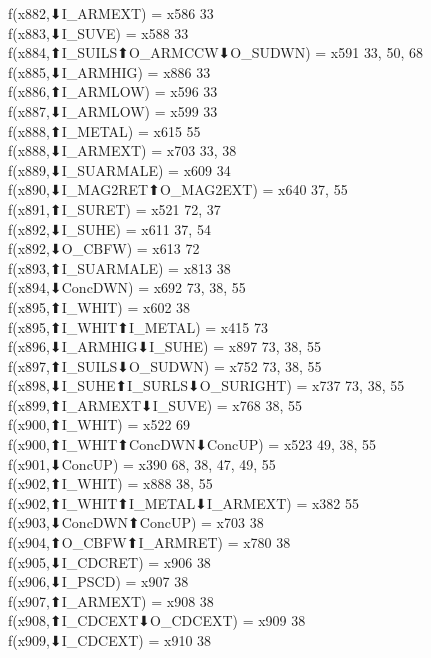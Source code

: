 f(x882,⬇I_ARMEXT) = x586 {33} \\
f(x883,⬇I_SUVE) = x588 {33} \\
f(x884,⬆I_SUILS⬆O_ARMCCW⬇O_SUDWN) = x591 {33, 50, 68} \\
f(x885,⬇I_ARMHIG) = x886 {33} \\
f(x886,⬆I_ARMLOW) = x596 {33} \\
f(x887,⬇I_ARMLOW) = x599 {33} \\
f(x888,⬆I_METAL) = x615 {55} \\
f(x888,⬇I_ARMEXT) = x703 {33, 38} \\
f(x889,⬇I_SUARMALE) = x609 {34} \\
f(x890,⬇I_MAG2RET⬆O_MAG2EXT) = x640 {37, 55} \\
f(x891,⬆I_SURET) = x521 {72, 37} \\
f(x892,⬇I_SUHE) = x611 {37, 54} \\
f(x892,⬇O_CBFW) = x613 {72} \\
f(x893,⬆I_SUARMALE) = x813 {38} \\
f(x894,⬇ConcDWN) = x692 {73, 38, 55} \\
f(x895,⬆I_WHIT) = x602 {38} \\
f(x895,⬆I_WHIT⬆I_METAL) = x415 {73} \\
f(x896,⬇I_ARMHIG⬇I_SUHE) = x897 {73, 38, 55} \\
f(x897,⬆I_SUILS⬇O_SUDWN) = x752 {73, 38, 55} \\
f(x898,⬇I_SUHE⬆I_SURLS⬇O_SURIGHT) = x737 {73, 38, 55} \\
f(x899,⬆I_ARMEXT⬇I_SUVE) = x768 {38, 55} \\
f(x900,⬆I_WHIT) = x522 {69} \\
f(x900,⬆I_WHIT⬆ConcDWN⬇ConcUP) = x523 {49, 38, 55} \\
f(x901,⬇ConcUP) = x390 {68, 38, 47, 49, 55} \\
f(x902,⬆I_WHIT) = x888 {38, 55} \\
f(x902,⬆I_WHIT⬆I_METAL⬇I_ARMEXT) = x382 {55} \\
f(x903,⬇ConcDWN⬆ConcUP) = x703 {38} \\
f(x904,⬆O_CBFW⬆I_ARMRET) = x780 {38} \\
f(x905,⬇I_CDCRET) = x906 {38} \\
f(x906,⬇I_PSCD) = x907 {38} \\
f(x907,⬆I_ARMEXT) = x908 {38} \\
f(x908,⬆I_CDCEXT⬇O_CDCEXT) = x909 {38} \\
f(x909,⬇I_CDCEXT) = x910 {38} \\
